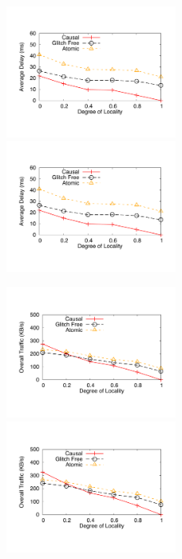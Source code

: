 \documentclass[11pt]{article}
\begin{document}
\begin{figure}
	\includegraphics[width=0.5\textwidth]{graphs/localityDelay}
	\includegraphics[width=0.5\textwidth]{referencegraphs/localityDelay}
\end{figure}
\begin{figure}
	\includegraphics[width=0.5\textwidth]{graphs/localityTraffic}
	\includegraphics[width=0.5\textwidth]{referencegraphs/localityTraffic}
\end{figure}
\end{document}
